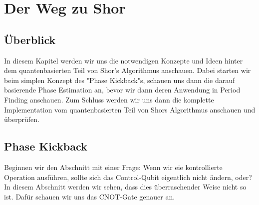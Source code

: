 \chapter{Der Weg zu Shor}
\section{Überblick}
In diesem Kapitel werden wir uns die notwendigen Konzepte und Ideen hinter dem quantenbasierten Teil von Shor's Algorithmus anschauen. Dabei starten wir beim simplen Konzept des "Phase Kickback"s, schauen uns dann die darauf basierende Phase Estimation an, bevor wir dann deren Anwendung in Period Finding anschauen. Zum Schluss werden wir uns dann die komplette Implementation vom quantenbasierten Teil von Shors Algorithmus anschauen und überprüfen.
\section{Phase Kickback}
Beginnen wir den Abschnitt mit einer Frage: Wenn wir eie kontrollierte Operation ausführen, sollte sich das Control-Qubit eigentlich nicht ändern, oder? In diesem Abschnitt werden wir sehen, dass dies überraschender Weise nicht so ist. Dafür schauen wir uns das CNOT-Gate genauer an. 